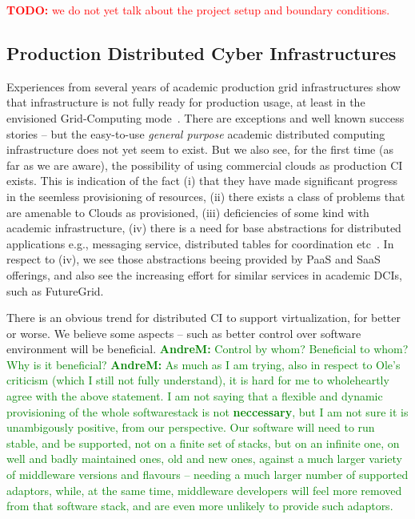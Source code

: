 \documentclass{article}
\newcommand{\I}[1]{\textit{#1}}
\newcommand{\B}[1]{\textbf{#1}}
\newcommand{\todo}[1]{{\textcolor{red}{\B{TODO:} #1 }}}
\newcommand{\amnote}[1]{{\textcolor{green}{   \B{AndreM:  } #1 }}}
\newcommand{\todo}[1]{}
\newcommand{\amnote}[1]{}
\begin{document}
\todo{we do not yet talk about the project setup and boundary
  conditions.}


 \subsection{Production Distributed Cyber Infrastructures}
 \label{ssec:state:dci}
  
  Experiences from several years of academic production grid
  infrastructures show that infrastructure is not fully ready for
  production usage, at least in the envisioned Grid-Computing
  mode~\cite{xsede_req,dpa-pdci-tr}.  There are exceptions and well
  known success stories -- but the easy-to-use \I{general purpose}
  academic distributed computing infrastructure does not yet seem to
  exist.  But we also see, for the first time (as far as we are
  aware), the possibility of using commercial clouds as production CI
  exists. This is indication of the fact (i) that they have made
  significant progress in the seemless provisioning of resources, (ii)
  there exists a class of problems that are amenable to Clouds as
  provisioned, (iii) deficiencies of some kind with academic
  infrastructure, (iv) there is a need for base abstractions for
  distributed applications e.g., messaging service, distributed tables
  for coordination etc~\cite{1542058}.  In respect to (iv), we see
  those abstractions beeing provided by PaaS and SaaS offerings, and
  also see the increasing effort for similar services in academic
  DCIs, such as FutureGrid.

  There is an obvious trend for distributed CI to support
  virtualization, for better or worse. We believe some aspects -- such
  as better control over software environment will be beneficial. 
  \amnote{Control by whom? Beneficial to whom? Why is it beneficial?}
  \amnote{As much as I am trying, also in respect to Ole's criticism
  (which I still not fully understand), it is hard for me to
  wholeheartly agree with the above statement.  I am not saying that a
  flexible and dynamic provisioning of the whole softwarestack is not
  \B{neccessary}, but I am not sure it is unambigously positive, from
  our perspective.  Our software will need to run stable, and be
  supported, not on a finite set of stacks, but on an infinite one, on
  well and badly maintained ones, old and new ones, against a much
  larger variety of middleware versions and flavours -- needing a much
  larger number of supported adaptors, while, at the same time,
  middleware developers will feel more removed from that software
  stack, and are even more unlikely to provide such adaptors.}
   
\end{document}
